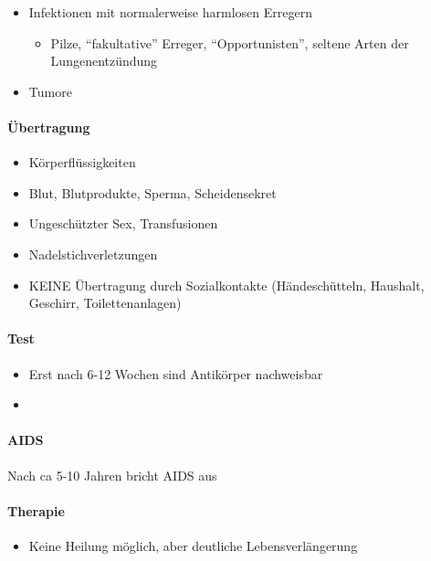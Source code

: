 \begin{itemize}
    \item Infektionen mit normalerweise harmlosen Erregern
\begin{itemize}
    \item Pilze, {\textquotedblleft}fakultative{\textquotedblright} Erreger,
    {\textquotedblleft}Opportunisten{\textquotedblright}, seltene Arten der
    Lungenentz\"undung
\end{itemize}

    \item Tumore
\end{itemize}


\paragraph{Übertragung}

\begin{itemize}
    \item K\"orperfl\"ussigkeiten
    \item Blut, Blutprodukte, Sperma, Scheidensekret
    \item Ungesch\"utzter Sex, Transfusionen
    \item Nadelstichverletzungen
    \item KEINE \"Ubertragung durch Sozialkontakte (H\"andesch\"utteln,
    Haushalt, Geschirr, Toilettenanlagen)
\end{itemize}
\paragraph{Test}
\begin{itemize}
    \item Erst nach 6-12 Wochen sind Antik\"orper nachweisbar
    \item {}
\end{itemize}
\paragraph{AIDS}
Nach ca 5-10 Jahren bricht AIDS aus   

\paragraph{Therapie}

\begin{itemize}
    \item Keine Heilung m\"oglich, aber deutliche Lebensverl\"angerung
\end{itemize}

